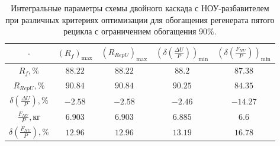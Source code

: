 \begin{table}
    \centering
    \begin{tabular}{|c|cccc|}
        \hline $\cdot$ & $(R_f)_\text{max}$ & $(R_{RepU})_\text{max}$ & $(\delta(\frac{\Delta U}{P}))_\text{min}$ & $(\delta(\frac{F_{NU}}{P}))_\text{min}$\\ \hline
    $R_f, \%$ & $88.22$ & $88.22$ & $88.2$ & $87.38$\\ \hline
    $R_{RepU}, \%$ & $90.84$ & $90.84$ & $90.25$ & $84.35$\\ \hline
    $\delta(\frac{\Delta U}{P}), \%$ & $-2.58$ & $-2.58$ & $-2.46$ & $-14.27$\\ \hline
    $\frac{F_{NU}}{P}, \text{кг}$ & $6.903$ & $6.903$ & $6.885$ & $6.6$\\ \hline
    $\delta(\frac{F_{NU}}{P}), \%$ & $12.96$ & $12.96$ & $13.19$ & $16.78$\\ \hline
\end{tabular}
\caption{Интегральные параметры схемы двойного каскада с НОУ-разбавителем при различных критериях оптимизации для обогащения регенерата пятого рецикла с ограничением обогащения 90\%.{\label{2opt5_90_int}}}
\end{table}

